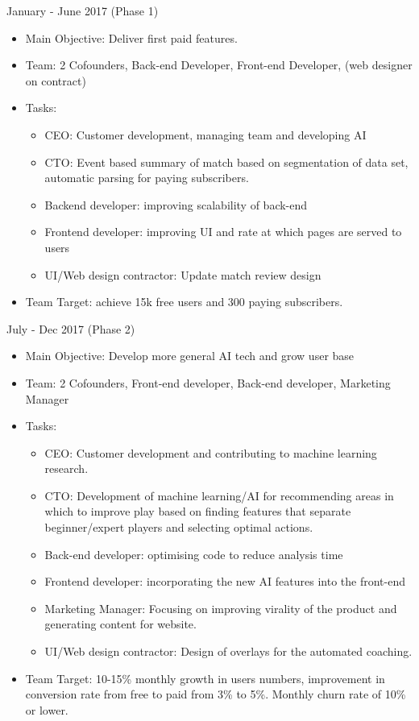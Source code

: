 \documentclass[12pt]{report} %
\begin{document}
January - June 2017 (Phase 1)
\begin{itemize} 
\item Main Objective: Deliver first paid features.
\item Team: 2 Cofounders, Back-end Developer, Front-end Developer, (web designer on contract)
\item Tasks:
\begin{itemize} 
\item CEO: Customer development, managing team and developing AI
\item CTO: Event based summary of match based on segmentation of data set, automatic parsing for paying subscribers.
\item Backend developer: improving scalability of back-end
\item Frontend developer: improving UI and rate at which pages are served to users
\item UI/Web design contractor: Update match review design
\end{itemize}
\item Team Target: achieve 15k free users and 300 paying subscribers.\\
\end{itemize} 

July - Dec 2017 (Phase 2)
\begin{itemize} 
\item Main Objective: Develop more general AI tech and grow user base
\item Team:  2 Cofounders, Front-end developer, Back-end developer, Marketing Manager
\item Tasks:
\begin{itemize}
\item CEO: Customer development and contributing to machine learning research.
\item CTO: Development of  machine learning/AI for recommending areas in which to improve play based on finding features that separate beginner/expert players and selecting optimal actions. 
\item Back-end developer: optimising code to reduce analysis time
\item Frontend developer: incorporating the new AI features into the front-end
\item Marketing Manager: Focusing on improving virality of the product and generating content for website.
\item UI/Web design contractor: Design of overlays for the automated coaching.
\end{itemize}
\item Team Target: 10-15\% monthly growth in users numbers, improvement in conversion rate from free to paid from 3\% to 5\%. Monthly churn rate of 10\% or lower.\\
\end{itemize}
\end{document}
